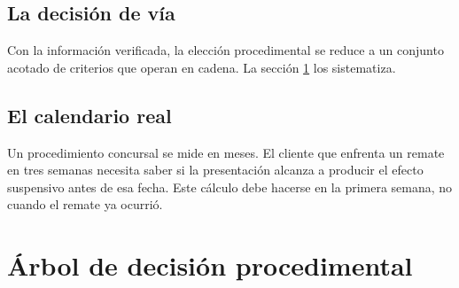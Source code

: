 \subsection{La decisión de vía}

Con la información verificada, la elección procedimental se reduce a un conjunto acotado
de criterios que operan en cadena. La sección \ref{sec:cap14-arbol} los sistematiza.

\subsection{El calendario real}

Un procedimiento concursal se mide en meses. El cliente que enfrenta un remate en tres
semanas necesita saber si la presentación alcanza a producir el efecto suspensivo antes
de esa fecha. Este cálculo debe hacerse en la primera semana, no cuando el remate ya
ocurrió.

\section{Árbol de decisión procedimental}
\label{sec:cap14-arbol}

